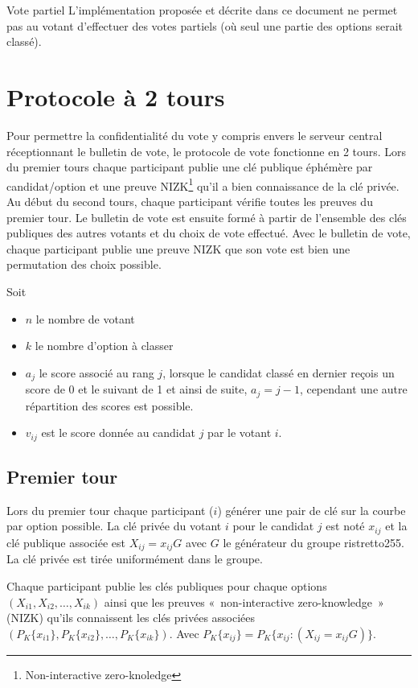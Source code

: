 \documentclass[../report]{subfiles}
\begin{document}
\begin{nota}{Vote partiel}
	L'implémentation proposée et décrite dans ce document ne permet pas au votant d'effectuer des votes 
	partiels (où seul une partie des options serait classé).
\end{nota}


\section{Protocole à 2 tours}

Pour permettre la confidentialité du vote y compris envers le serveur central réceptionnant
le bulletin de vote, le protocole de vote fonctionne en 2 tours.
Lors du premier tours chaque participant publie une clé publique éphémère par candidat/option et une 
preuve NIZK\footnote{Non-interactive zero-knoledge} qu'il a bien connaissance de la clé privée.
Au début du second tours, chaque participant vérifie toutes les preuves du premier tour.
Le bulletin de vote est ensuite formé à partir de l'ensemble des clés publiques des autres 
votants et du choix de vote effectué.
Avec le bulletin de vote, chaque participant publie une preuve NIZK que son vote est bien 
une permutation des choix possible.

Soit 

\begin{itemize}
	\item $n$ le nombre de votant
	\item $k$ le nombre d'option à classer
	\item $a_j$ le score associé au rang $j$, lorsque le candidat classé en dernier reçois un score de 0 et le suivant de 1 et ainsi de suite, $a_j = j - 1$, cependant une autre répartition des scores est possible.
	\item $v_{ij}$ est le score donnée au candidat $j$ par le votant $i$.
\end{itemize}

\subsection{Premier tour}

Lors du premier tour chaque participant ($i$) générer une pair de clé sur la courbe par option possible.
La clé privée du votant $i$ pour le candidat $j$ est noté $x_{ij}$ et la clé publique associée 
est $X_{ij} = x_{ij} G$ avec $G$ le générateur du groupe ristretto255.
La clé privée est tirée uniformément dans le groupe.

Chaque participant publie les clés publiques pour chaque options $(X_{i1}, X_{i2}, \dots, X_{ik})$ ainsi que les preuves 
«~non-interactive zero-knowledge~» (NIZK) qu'ils connaissent les clés privées associées \\ $(P_K\{x_{i1}\}, P_K\{x_{i2}\}, \dots, P_K\{x_{ik}\})$. 
Avec $P_K\{x_{ij}\} = P_K\{x_{ij}: (X_{ij} = x_{ij} G)\}$.
\end{document}
